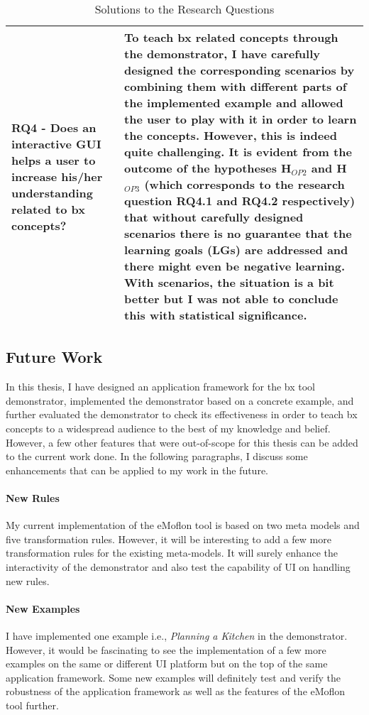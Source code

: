 \begin{table}
	\begin{tabular}{|p{5cm}|p{9.5cm}|}
		\hline	
		\textbf{RQ4 -} Does an interactive GUI helps a user to increase his/her understanding related to bx concepts? &
		To teach bx related concepts through the demonstrator, I have carefully designed the corresponding scenarios by combining them with different parts of the implemented example  and allowed the user to play with it in order to learn the concepts. However, this is indeed quite challenging. It is evident from the outcome of the hypotheses H$_{OP2}$ and H$_{OP3}$ (which corresponds to the research question \textbf{RQ4.1} and \textbf{RQ4.2} respectively) that without carefully designed scenarios there is no guarantee that the learning goals (\textbf{LG}s) are addressed and there might even be negative learning.  With scenarios, the situation is a bit better but I was not able to conclude this with statistical significance.\\
		\hline			
	\end{tabular}
	\caption{Solutions to the Research Questions}
	\label{tab:Solutions_ResearchQuestions}
\end{table}

\subsection{Future Work}\label{subsec:futurework}
In this thesis, I have designed an application framework for the bx tool demonstrator, implemented the demonstrator based on a concrete example, and further evaluated the demonstrator to check its effectiveness in order to teach bx concepts to a widespread audience to the best of my knowledge and belief. However, a few other features that were out-of-scope for this thesis can be added to the current work done. In the following paragraphs, I discuss some enhancements that can be applied to my work in the future. 
\paragraph{New Rules}
My current implementation of the eMoflon tool is based on two meta models and five transformation rules. However, it will be interesting to add a few more transformation rules for the existing meta-models. It will surely enhance the interactivity of the demonstrator and also test the capability of UI on handling new rules.

\paragraph{New Examples} I have implemented one example i.e., \textit{Planning a Kitchen} in the demonstrator. However, it would be fascinating to see the implementation of a few more examples on the same or different UI platform but on the top of the same application framework. Some new examples will definitely test and verify the robustness of the application framework as well as the features of the eMoflon tool further.

